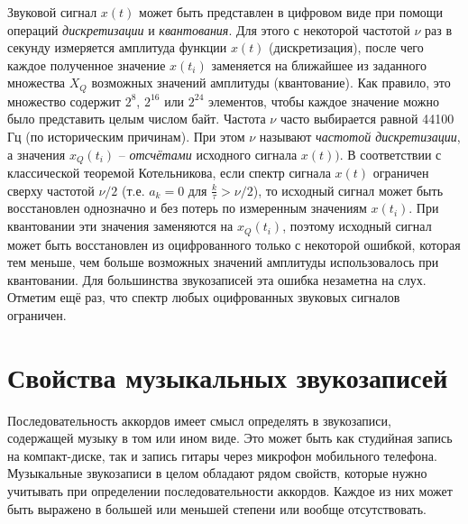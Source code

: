 Звуковой сигнал $x(t)$ может быть представлен в цифровом виде при помощи
операций \emph{дискретизации} и \emph{квантования}. Для этого с некоторой
частотой $\nu$ раз в секунду измеряется амплитуда функции $x(t)$
(дискретизация), после чего каждое полученное значение $x(t_i)$ заменяется на
ближайшее из заданного множества $X_Q$ возможных значений амплитуды
(квантование). Как правило, это множество содержит $2^8$, $2^{16}$ или $2^{24}$
элементов, чтобы каждое значение можно было представить целым числом байт.
Частота $\nu$ часто выбирается равной 44100 Гц (по историческим причинам). При
этом $\nu$ называют \emph{частотой дискретизации}, а значения $x_Q(t_i)$ --
\emph{отсчётами} исходного сигнала $x(t))$. В соответствии с классической
теоремой Котельникова, если спектр сигнала $x(t)$ ограничен сверху частотой
$\nu/2$ (т.е. $a_k = 0$ для $\frac{k}{\tau} > \nu/2$), то исходный сигнал может
быть восстановлен однозначно и без потерь по измеренным значениям $x(t_i)$. При
квантовании эти значения заменяются на $x_Q(t_i)$, поэтому исходный сигнал может
быть восстановлен из оцифрованного только с некоторой ошибкой, которая тем
меньше, чем больше возможных значений амплитуды использовалось при квантовании.
Для большинства звукозаписей эта ошибка незаметна на слух. Отметим ещё раз, что
спектр любых оцифрованных звуковых сигналов ограничен.

\section{Свойства музыкальных звукозаписей} \label{sectT_musrec}

Последовательность аккордов имеет смысл определять в звукозаписи, содержащей
музыку в том или ином виде. Это может быть как студийная запись на
компакт-диске, так и запись гитары через микрофон мобильного телефона.
Музыкальные звукозаписи в целом обладают рядом свойств, которые нужно учитывать
при определении последовательности аккордов. Каждое из них может быть выражено
в большей или меньшей степени или вообще отсутствовать.

